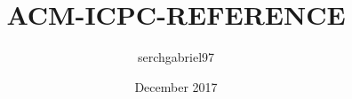 \documentclass{article}
\title{ACM-ICPC-REFERENCE}
\author{serchgabriel97 }
\date{December 2017}
\begin{document}
\maketitle
\newpage

\begin{multicols*}{2}

\tableofcontents
\newpage

\begin{python}[getContents.py]
\end{python}%

\end{multicols*}
\end{document}
